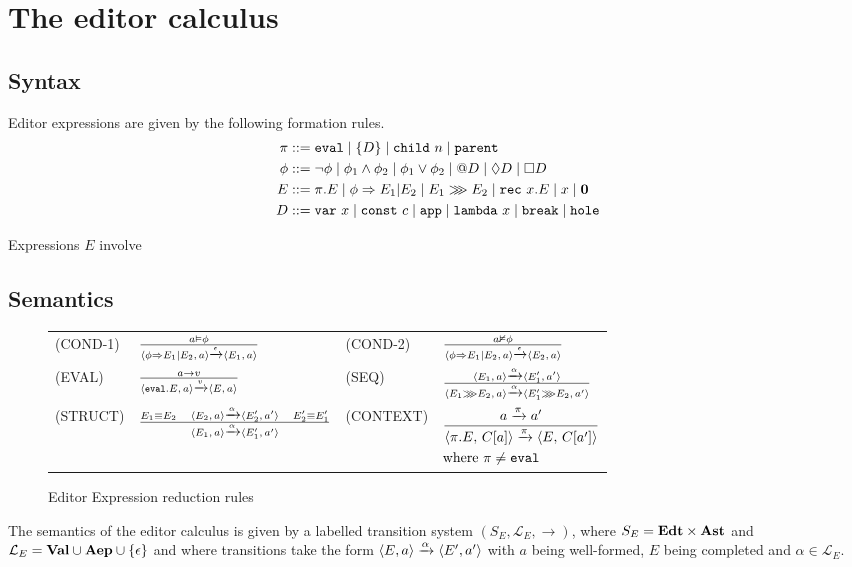 \section{The editor calculus}

\subsection{Syntax}

Editor expressions are given by the following formation rules.
%
\begin{align}
    \pi &::= \eval
  \mid \sub{D}
  \mid \child{n}
  \mid \parent \label{aep-formation-rules} \\
   \phi &::= \neg\phi
  \mid \conjunction{\phi_1}{\phi_2}
  \mid \disjunction{\phi_1}{\phi_2}
  \mid \at{D}
  \mid \possibly{D}
  \mid \necessarily{D} \label{eed-formation-rules} \\
    E &::= \pre{\pi}{E}
  \mid \bicond{\phi}{E_1}{E_2}
  \mid \seqcomp{E_1}{E_2}
  \mid \rec{x}{E}
  \mid \call{x}
  \mid \nil \label{edt-formation-rules} \\
    D &::= \var{x}
  \mid \const{c}
  \mid \aamApp
  \mid \aamLambda{x}
  \mid \aamBreak
  \mid \aamHole \label{aam-formation-rules}
\end{align}

Expressions $E$ involve 

\subsection{Semantics}

\begin{figure*}
  \center
  \renewcommand{\arraystretch}{2}
  \begin{tabular}{llll}
    \scriptsize(COND-1)  & $ \CondOne $           & \scriptsize(COND-2) & $ \CondTwo$ \\
    \scriptsize(EVAL)    & $ \Eval $              & \scriptsize(SEQ)    & $ \Seq$     \\
    \scriptsize(STRUCT)  & $\Struct$              & \scriptsize(CONTEXT)& \scriptsize$\Context$
  \end{tabular}
  \caption{Editor Expression reduction rules}
  \label{fig:edtreductionrules}
\end{figure*}

The semantics of the editor calculus is given by a labelled transition system
$(S_E, \mathcal{L}_E, \to)$, where $S_E = \edt \times \AST$ and $\mathcal{L}_E
= \val \cup \aep \cup \{\epsilon\}$ and where transitions take the form
$\breakpoint{E, a} \transition{$\alpha$} \breakpoint{E', a'}$ with $a$ being
well-formed, $E$ being completed and $\alpha \in \mathcal{L}_E$. 

